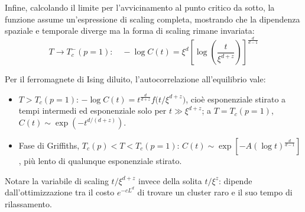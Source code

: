 Infine, calcolando il limite per l'avvicinamento al punto critico da sotto, la funzione assume un'espressione di scaling completa, mostrando che la dipendenza spaziale e temporale diverge ma la forma di scaling rimane invariata:
\begin{equation}
    T \to T_c^-(p=1) : \quad - \log C(t) = \xi^d \left[ \log\left( \frac{t}{\xi^{d+z}} \right) \right]^{\frac{d}{d-1}}
\end{equation}

\begin{tcolorbox}[colback=colorC!10, colframe=colorC!80!black, title=\textbf{Riepilogo (Bray, PRL 60, 720 (1988))}]
Per il ferromagnete di Ising diluito, l'autocorrelazione all'equilibrio vale:
\begin{itemize}
    \item $T > T_c(p=1)$: $-\log C(t) = t^{\frac{d}{d+z}} f\big(t/\xi^{d+z}\big)$, cioè esponenziale stirato a tempi intermedi ed esponenziale solo per $t \gg \xi^{d+z}$; a $T = T_c(p=1)$, $C(t) \sim \exp(-t^{d/(d+z)})$.
    \item Fase di Griffiths, $T_c(p) < T < T_c(p=1)$: $C(t) \sim \exp\left[-A(\log t)^{\frac{d}{d-1}}\right]$, più lento di qualunque esponenziale stirato.
\end{itemize}
Notare la variabile di scaling $t/\xi^{d+z}$ invece della solita $t/\xi^z$: dipende dall'ottimizzazione tra il costo $e^{-cL^d}$ di trovare un cluster raro e il suo tempo di rilassamento.
\end{tcolorbox}
